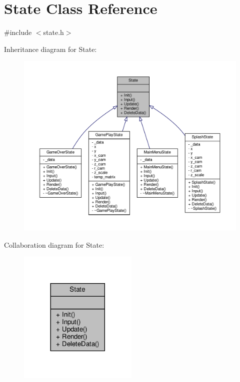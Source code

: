 \hypertarget{classState}{}\section{State Class Reference}
\label{classState}


{\ttfamily \#include $<$state.\+h$>$}



Inheritance diagram for State\+:
\nopagebreak
\begin{figure}[H]
\begin{center}
\leavevmode
\includegraphics[width=350pt]{classState__inherit__graph}
\end{center}
\end{figure}


Collaboration diagram for State\+:
\nopagebreak
\begin{figure}[H]
\begin{center}
\leavevmode
\includegraphics[width=161pt]{classState__coll__graph}
\end{center}
\end{figure}

